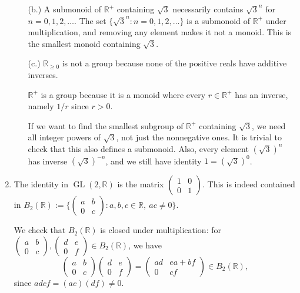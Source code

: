 \documentclass[11pt, reqno]{article}
\begin{document}
\begin{enumerate}
\begin{enumerate}
        \item[(b.)] A submonoid of $\mathbb{R}^+$ containing $\sqrt{3}$ necessarily contains 
        $\sqrt{3}^n$ for $n = 0, 1, 2, \dots$. The set $\{\sqrt{3}^n: n = 0, 1, 2, \dots\}$
        is a submonoid of $\mathbb{R}^+$ under multiplication, and removing any element makes it not a monoid. 
        This is the smallest monoid containing $\sqrt{3}$.

        \item[(c.)] $\mathbb{R}_{\geq 0}$ is not a group because none of the positive
        reals have additive inverses.

        $\mathbb{R}^+$ is a group because it is a monoid where every $r \in \mathbb{R}^+$ has 
        an inverse, namely $1/r$ since $r > 0$.

        If we want to find the smallest subgroup of $\mathbb{R}^+$ containing $\sqrt{3}$,
        we need all integer powers of $\sqrt{3}$, not just the nonnegative ones. It is trivial
        to check that this also defines a submonoid. Also, every
        element $(\sqrt{3})^n$ has inverse $(\sqrt{3})^{-n}$, and we still have identity $1 = (\sqrt{3})^0$.
    \end{enumerate}

    \item The identity in $\operatorname{GL}(2, \mathbb{R})$ is the matrix $\left(\begin{smallmatrix}
        1 & 0 \\ 0 & 1
    \end{smallmatrix}\right)$. This is indeed contained in 
    $B_2(\mathbb{R}) := \{\left(\begin{smallmatrix} a & b \\ 0 & c \end{smallmatrix}\right): a,b,c \in \mathbb{R},\ ac \neq 0\}$.

    We check that $B_2(\mathbb{R})$ is closed under multiplication: for $\left(\begin{smallmatrix}
        a & b \\ 0 & c
    \end{smallmatrix}\right), \left(\begin{smallmatrix}
        d & e \\ 0 & f
    \end{smallmatrix}\right) \in B_2(\mathbb{R})$, we have
    \[
    \begin{pmatrix}
        a & b \\ 0 & c
    \end{pmatrix}
    \begin{pmatrix}
        d & e \\ 0 & f
    \end{pmatrix}
    = \begin{pmatrix}
        ad & ea + bf \\ 0 & cf
    \end{pmatrix} \in B_2(\mathbb{R}),
    \]
    since $adcf = (ac)(df) \neq 0$.


\end{enumerate}
\end{document}
